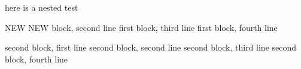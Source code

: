 here is a nested test
\begin{one}
NEW NEW block, second line
		first block, third line
		first block, fourth line
	\begin{two}
		second block, first line
		second block, second line
		second block, third line
		second block, fourth line
	\end{two}
\end{one}
